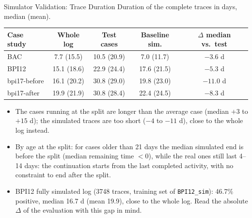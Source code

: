 \documentclass[aspectratio=169]{beamer} %
\begin{document}
\begin{frame}{Simulator Validation: Trace Duration}
  \small
  Duration of the complete traces in days, median (mean).
  \begin{center}
  \begin{tabular}{lcccc}
    \toprule
    Case study & Whole log & Test cases & Baseline sim. & $\Delta$ median vs.\ test \\
    \midrule
    BAC          & 7.7 (15.5)  & 10.5 (20.9) & 7.0 (11.7)  & $-3.6$ d  \\
    BPI12        & 15.1 (18.6) & 22.9 (24.4) & 17.6 (21.5) & $-5.3$ d  \\
    bpi17-before & 16.1 (20.2) & 30.8 (29.0) & 19.8 (23.0) & $-11.0$ d \\
    bpi17-after  & 19.9 (21.9) & 30.8 (28.4) & 22.4 (24.5) & $-8.3$ d  \\
    \bottomrule
  \end{tabular}
  \end{center}
  \scriptsize
  \begin{itemize}
    \item The cases running at the split are \alert{longer} than the average case (median $+3$ to $+15$ d); the
      simulated traces are \alert{too short} ($-4$ to $-11$ d), close to the whole log instead.
    \item By age at the split: for cases older than 21 days the median simulated end is \alert{before the split}
      (median remaining time $< 0$), while the real ones still last 4--14 days: the continuation starts from the
      last completed activity, with no constraint to end after the split.
    \item BPI12 fully simulated log (3748 traces, training set of \texttt{BPI12\_sim}): 46.7\% positive, median
      16.7 d (mean 19.9), close to the whole log. Read the absolute $\Delta$ of the evaluation with this gap in mind.
  \end{itemize}
\end{frame}
\end{document}
